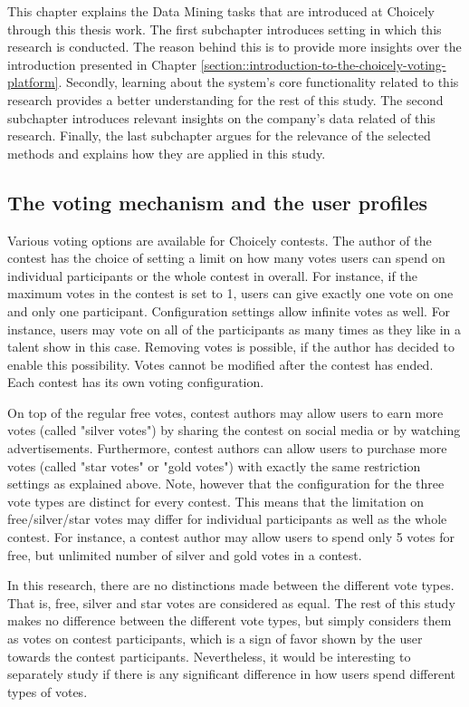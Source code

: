 This chapter explains the Data Mining tasks that are introduced at Choicely through this thesis work. The first subchapter introduces setting in which this research is conducted. The reason behind this is to provide more insights over the introduction presented in Chapter \ref{section::introduction-to-the-choicely-voting-platform}. Secondly, learning about the system's core functionality related to this research provides a better understanding for the rest of this study. The second subchapter introduces relevant insights on the company's data related of this research. Finally, the last subchapter argues for the relevance of the selected methods and explains how they are applied in this study. 

\subsection{The voting mechanism and the user profiles}
Various voting options are available for Choicely contests. The author of the contest has the choice of setting a limit on how many votes users can spend on individual participants or the whole contest in overall. For instance, if the maximum votes in the contest is set to 1, users can give exactly one vote on one and only one participant. Configuration settings allow infinite votes as well. For instance, users may vote on all of the participants as many times as they like in a talent show in this case. Removing votes is possible, if the author has decided to enable this possibility. Votes cannot be modified after the contest has ended. Each contest has its own voting configuration. 
    
On top of the regular free votes, contest authors may allow users to earn more votes (called "silver votes") by sharing the contest on social media or by watching advertisements. Furthermore, contest authors can allow users to purchase more votes (called "star votes" or "gold votes") with exactly the same restriction settings as explained above. Note, however that the configuration for the three vote types are distinct for every contest. This means that the limitation on free/silver/star votes may differ for individual participants as well as the whole contest. For instance, a contest author may allow users to spend only 5 votes for free, but unlimited number of silver and gold votes in a contest. 

In this research, there are no distinctions made between the different vote types. That is, free, silver and star votes are considered as equal. The rest of this study makes no difference between the different vote types, but simply considers them as votes on contest participants, which is a sign of favor shown by the user towards the contest participants. Nevertheless, it would be interesting to separately study if there is any significant difference in how users spend different types of votes. 

